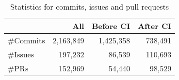 \begin{table}[t]
	\centering
	\caption{Statistics for commits, issues and pull requests}
	\vspace{-0.2cm}
	\label{count_info}
	\begin{tabular}{lrrr}
		\hline
		& All     & Before CI & After CI \\ \hline
		\#Commits & 2,163,849 & 1,425,358   & 738,491   \\ \hline
		\#Issues  & 197,232  & 86,539     & 110,693   \\ \hline
		\#PRs      & 152,969  & 54,440     & 98,529    \\ \hline
	\end{tabular}
\end{table}




